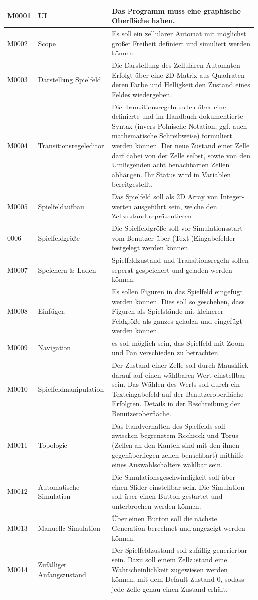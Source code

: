 \documentclass[11pt,a4paper]{article}
\begin{document}
\begin{longtable}[m]{|m{2.2cm}|m{4cm}|m{8cm}|}
\hline
M0001     & UI & Das Programm muss eine graphische Oberfläche haben.  \\
\hline
M0002 & Scope & Es soll ein zellulärer Automat mit möglichst großer Freiheit definiert und simuliert werden können.  \\
\hline
M0003 & Darstellung Spielfeld & Die Darstellung des Zellulären Automaten Erfolgt über eine 2D Matrix aus Quadraten deren Farbe und Helligkeit den Zustand eines Feldes wiedergeben. \\
\hline
M0004 & Transitionsregeleditor & Die Transitionsregeln sollen über eine definierte und im Handbuch dokumentierte Syntax (invers Polnische Notation, ggf. auch mathematische Schreibweise) formuliert werden können. Der neue Zustand einer Zelle darf dabei von der Zelle selbst, sowie von den Umliegenden acht benachbarten Zellen abhängen. Ihr Status wird in Variablen bereitgestellt.\\
\hline
M0005 & Spielfeldaufbau & Das Spielfeld soll als 2D Array von Integer-werten ausgeführt sein, welche den Zellzustand repräsentieren.\\
\hline
0006 & Spielfeldgröße & Die Spielfeldgröße soll vor Simulationsstart vom Benutzer über (Text-)Eingabefelder festgelegt werden können.\\
\hline
M0007 & Speichern \& Laden & Spielfeldzustand und Transitionsregeln sollen seperat gespeichert und geladen werden können.  \\
\hline
M0008 & Einfügen & Es sollen Figuren in das Spielfeld eingefügt werden können. Dies soll so geschehen, dass Figuren als Spielstände mit kleinerer Feldgröße als ganzes geladen und eingefügt werden können. \\
\hline
M0009 & Navigation & es soll möglich sein, das Spielfeld mit Zoom und Pan verschieden zu betrachten. \\
\hline
M0010 & Spielfeldmanipulation & Der Zustand einer Zelle soll durch Mausklick darauf auf einen wählbaren Wert einstellbar sein. Das Wählen des Werts soll durch ein Texteingabefeld auf der Benutzeroberfläche Erfolgten. Details in der Beschreibung der Benutzeroberfläche.\\
\hline
M0011 & Topologie & Das Randverhalten des Spielfelds soll zwischen begrenztem Rechteck und Torus (Zellen an den Kanten sind mit den ihnen gegenüberliegen zellen benachbart) mithilfe eines Auswahlschalters wählbar sein.\\
\hline
M0012 & Automatische Simulation & Die Simulationsgeschwindigkeit soll über einen Slider einstellbar sein. Die Simulation soll über einen Button gestartet und unterbrochen werden können.\\
\hline
M0013 & Manuelle Simulation & Über einen Button soll die nächste Generation berechnet und angezeigt werden können. \\
\hline
M0014 & Zufälliger Anfangszustand & Der Spielfeldzustand soll zufällig generierbar sein. Dazu soll einem Zellzustand eine Wahrscheinlichkeit zugewiesen werden können, mit dem Default-Zustand 0, sodass jede Zelle genau einen Zustand erhält.\\


\end{longtable}
\end{document}
